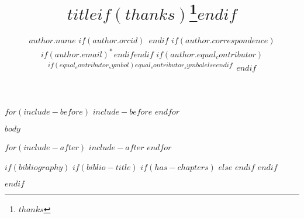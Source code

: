 \documentclass[9pt, twocolumn, toc, lineno]{$documentclass$}
\title{$title$$if(thanks)$\thanks{$thanks$}$endif$}
\author[$for(author.institute_indices)$$author.institute_indices$$sep$,$endfor$]{%
  $author.name$%
  $if(author.orcid)$~\protect\orcid{$author.orcid$}$endif$%
  $if(author.correspondence)$$if(author.email)$\textsuperscript{*\,}$endif$$endif$%
  $if(author.equal_contributor)$
  \textsuperscript{$if(equal_contributor_symbol)$$equal_contributor_symbol$$else$\textdagger$endif$\,}%
  $endif$%
}
\affil[$institute.index$]{$institute.name$}
\begin{document}
\maketitle

\renewcommand{\figureautorefname}{Fig.}
\renewcommand{\tableautorefname}{Tab.}
\renewcommand{\equationautorefname}{Eq.}

\makeatletter\if@switchSI\else
{}
\fi\makeatother

$for(include-before)$
$include-before$
$endfor$

$body$

$for(include-after)$
$include-after$
$endfor$

$if(bibliography)$
  $if(biblio-title)$
    $if(has-chapters)$
\renewcommand\bibname{$biblio-title$}
    $else$
\renewcommand\refname{$biblio-title$}
    $endif$
  $endif$

$endif$

\end{document}

